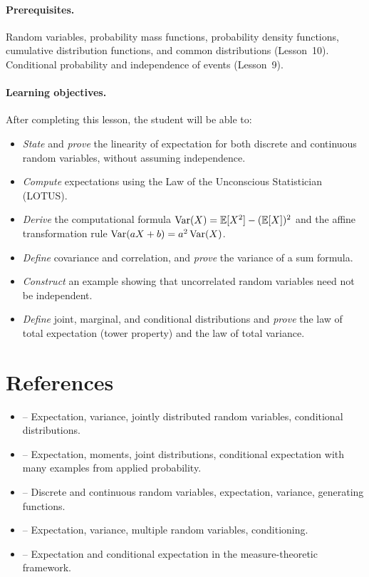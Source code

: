 \documentclass[11pt,a4paper]{article}
\begin{document}
\paragraph{Prerequisites.}
Random variables, probability mass functions, probability density
functions, cumulative distribution functions, and common distributions
(Lesson~10). Conditional probability and independence of events
(Lesson~9).

\paragraph{Learning objectives.}
After completing this lesson, the student will be able to:
\begin{itemize}
    \item \emph{State} and \emph{prove} the linearity of expectation for
    both discrete and continuous random variables, without assuming
    independence.
    \item \emph{Compute} expectations using the Law of the Unconscious
    Statistician (LOTUS).
    \item \emph{Derive} the computational formula
    $\operatorname{Var}(X) = \mathbb{E}[X^2] - (\mathbb{E}[X])^2$ and the affine transformation rule
    $\operatorname{Var}(aX + b) = a^2\operatorname{Var}(X)$.
    \item \emph{Define} covariance and correlation, and \emph{prove}
    the variance of a sum formula.
    \item \emph{Construct} an example showing that uncorrelated random
    variables need not be independent.
    \item \emph{Define} joint, marginal, and conditional distributions
    and \emph{prove} the law of total expectation (tower property) and
    the law of total variance.
\end{itemize}


\section{References}
\label{sec:references}

\begin{itemize}
    \item \citet[Chapters 4, 6--7]{ross2019} -- Expectation, variance,
    jointly distributed random variables, conditional distributions.
    \item \citet[Chapters 4, 6--7]{blitzstein2019} -- Expectation,
    moments, joint distributions, conditional expectation with many
    examples from applied probability.
    \item \citet[Chapter 3]{grimmett2020} -- Discrete and continuous
    random variables, expectation, variance, generating functions.
    \item \citet[Chapters 2--4]{bertsekas2008} -- Expectation, variance,
    multiple random variables, conditioning.
    \item \citet[Sections 1.5--1.6]{durrett2019} -- Expectation and
    conditional expectation in the measure-theoretic framework.
\end{itemize}
\end{document}
